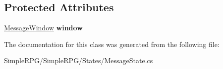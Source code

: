 \subsection*{Protected Attributes}
\begin{DoxyCompactItemize}
\item 
\hypertarget{class_simple_r_p_g_1_1_states_1_1_message_state_ae73420c7b3446e1db21cf6bb14861358}{\hyperlink{class_simple_r_p_g_1_1_windows_1_1_message_window}{Message\-Window} {\bfseries window}}\label{class_simple_r_p_g_1_1_states_1_1_message_state_ae73420c7b3446e1db21cf6bb14861358}

\end{DoxyCompactItemize}


The documentation for this class was generated from the following file\-:\begin{DoxyCompactItemize}
\item 
Simple\-R\-P\-G/\-Simple\-R\-P\-G/\-States/Message\-State.\-cs\end{DoxyCompactItemize}
